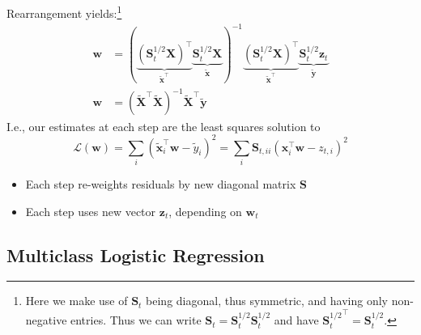 \documentclass[11pt, %
	oneside, %
	english, %
	onehalfspacing, %
	parskip, %
	]{article} %
\theoremstyle{definition}
\begin{document}
Rearrangement yields:\footnote{Here we make use of $\mathbf{S}_t$ being diagonal, thus symmetric, and having only non-negative entries. Thus we can write $\mathbf{S}_t = \mathbf{S}_t^{1/2} \mathbf{S}_t^{1/2}$ and have ${\mathbf{S}_t^{1/2}}^\top = \mathbf{S}_t^{1/2}$.}
\begin{equation*}
	\begin{aligned}
		\mathbf{w}&=(\underbrace{\left(\mathbf{S}_t^{1 / 2} \mathbf{X}\right)^{\top}}_{\tilde{\mathbf{x}}^{\top}} \underbrace{\mathbf{S}_t^{1 / 2} \mathbf{X}}_{\tilde{\mathbf{x}}})^{-1} \underbrace{\left(\mathbf{S}_t^{1 / 2} \mathbf{X}\right)^{\top}}_{\tilde{\mathbf{x}}^{\top}} \underbrace{\mathbf{S}_t^{1 / 2} \mathbf{z}_t}_{\tilde{\mathbf{y}}} \\
		\mathbf{w}&=\left(\tilde{\mathbf{X}}^{\top} \tilde{\mathbf{X}}\right)^{-1} \tilde{\mathbf{X}}^{\top} \tilde{\mathbf{y}}
	\end{aligned}
\end{equation*}
I.e., our estimates at each step are the least squares solution to
\begin{equation*}
	\mathcal{L}(\mathbf{w})=\sum_i\left(\tilde{\mathbf{x}}_i^{\top} \mathbf{w}-\tilde{y}_i\right)^2 = \sum_i\mathbf{S}_{t, i i} \left( \mathbf{x}_i^{\top} \mathbf{w}- z_{t, i}\right)^2
\end{equation*}
\begin{itemize}
	\item Each step re-weights residuals by new diagonal matrix $\mathbf{S}$
	\item Each step uses new vector $\mathbf{z}_t$, depending on $\mathbf{w}_t$
\end{itemize}

\subsection*{Multiclass Logistic Regression}
\end{document}
